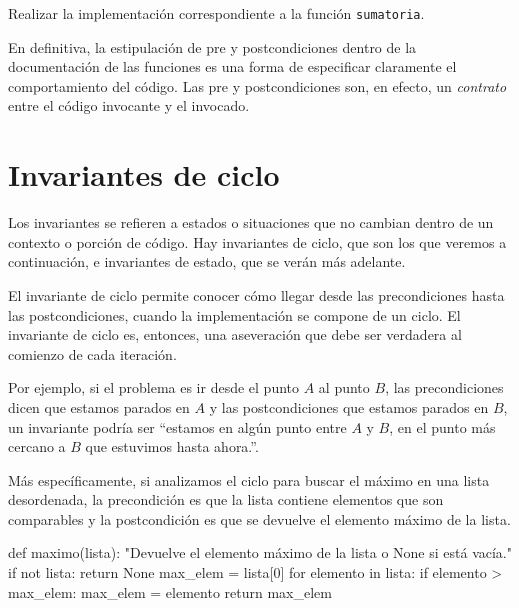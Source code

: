 \begin{ejercicio}
Realizar la implementación correspondiente a la función \lstinline!sumatoria!.
\end{ejercicio}

En definitiva, la estipulación de pre y postcondiciones dentro de la
documentación de las funciones es una forma de especificar claramente el
comportamiento del código.  Las pre y postcondiciones son, en efecto, un
\textit{contrato} entre el código invocante y el invocado.

\section{Invariantes de ciclo}


\label{invariantes}
Los invariantes se refieren a estados o situaciones que no cambian dentro
de un contexto o porción de código.  Hay invariantes de ciclo, que son los
que veremos a continuación, e invariantes de estado, que se verán más
adelante.

El invariante de ciclo permite conocer cómo llegar desde las precondiciones
hasta las postcondiciones, cuando la implementación se compone de un ciclo.
El invariante de ciclo es, entonces, una
aseveración que debe ser verdadera al comienzo de cada iteración.

Por ejemplo, si el problema es ir desde el punto $A$ al punto $B$, las
precondiciones dicen que estamos parados en $A$ y las postcondiciones que
estamos parados en $B$, un invariante podría ser ``estamos en algún punto entre
$A$ y $B$, en el punto más cercano a $B$ que estuvimos hasta ahora.''.

Más específicamente, si analizamos el ciclo para buscar el máximo en una lista
desordenada, la precondición es que la lista contiene elementos que son
comparables y la postcondición es que se devuelve el elemento máximo de la
lista.

\begin{codigo-python-sn}
def maximo(lista):
    "Devuelve el elemento máximo de la lista o None si está vacía."
    if not lista:
        return None
    max_elem = lista[0]
    for elemento in lista:
        if elemento > max_elem:
            max_elem = elemento
    return max_elem
\end{codigo-python-sn}

